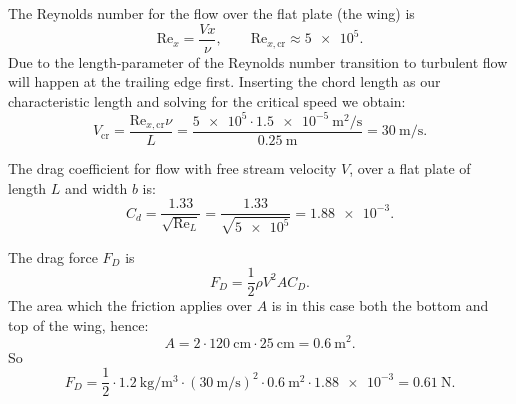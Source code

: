 \begin{derivation}
  The Reynolds number for the flow over the flat plate (the wing) is
  \begin{equation*}
    \mathrm{Re}_{x} = \frac{V x}{\nu}, \qquad \mathrm{Re}_{x, \mathrm{cr}} \approx \num{5e5}
  .\end{equation*}
  Due to the length-parameter of the Reynolds number transition to turbulent flow will happen at the trailing edge first.
  Inserting the chord length as our characteristic length and solving for the critical speed we obtain:
  \begin{equation*}
    V_{\mathrm{cr}} = \frac{\mathrm{Re}_{x, \mathrm{cr}} \nu}{L} = \frac{\num{5e5} \cdot \qty{1,5e-5}{\m^2\per\s}}{\qty{0,25}{\m} } = \qty{30}{\m\per\s} 
  .\end{equation*}
  
  The drag coefficient for flow with free stream velocity $V$, over a flat plate of length $L$ and width $b$ is:
  \begin{equation*}
    C_d = \frac{\num{1,33} }{\sqrt{\mathrm{Re}_L}} = \frac{\num{1,33} }{\sqrt{\num{5e5} }} = \num{1,88e-3} 
  .\end{equation*}
  
  The drag force $F_D$ is
  \begin{equation*}
    F_D = \frac{1}{2} \rho V^2 A C_D
  .\end{equation*}
  The area which the friction applies over $A$ is in this case both the bottom and top of the wing, hence:
  \begin{equation*}
    A = 2 \cdot \qty{120}{\cm} \cdot \qty{25}{\cm}  = \qty{0,6}{\meter^2}
  .\end{equation*}
  So
  \begin{equation*}
    F_D = \frac{1}{2} \cdot \qty{1,2}{\kg\per\m^3} \cdot \left( \qty{30}{\m\per\s}  \right)^2 \cdot \qty{0,6}{\m^2} \cdot \num{1,88e-3}  = \qty{0,61}{\N} 
  .\end{equation*}
\end{derivation}

